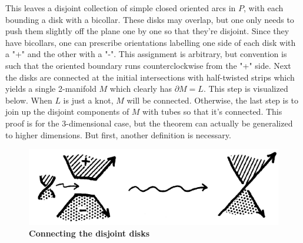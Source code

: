 \documentclass{article}
\begin{document}
This leaves a disjoint collection of simple closed oriented arcs in $P$, with each bounding a disk with a bicollar.  These disks may overlap, but one only needs to push them slightly off the plane one by one so that they're disjoint.  Since they have bicollars, one can prescribe orientations labelling one side of each disk with a "+" and the other with a "-".  This assignment is arbitrary, but convention is such that the oriented boundary runs counterclockwise from the "+" side.  Next the disks are connected at the initial intersections with half-twisted strips which yields a single 2-manifold $M$ which clearly has $\partial M = L$. This step is visualized below.  When $L$ is just a knot, $M$ will be connected.  Otherwise, the last step is to join up the disjoint components of $M$ with tubes so that it's connected.  This proof is for the 3-dimensional case, but the theorem can actually be generalized to higher dimensions.  But first, another definition is necessary.
\clearpage
\begin{figure}[h!]
	\begin{center}
	\includegraphics{strips.png}
	\caption \textbf{Connecting the disjoint disks}
	\end{center}
\end{figure}  
\end{document}
